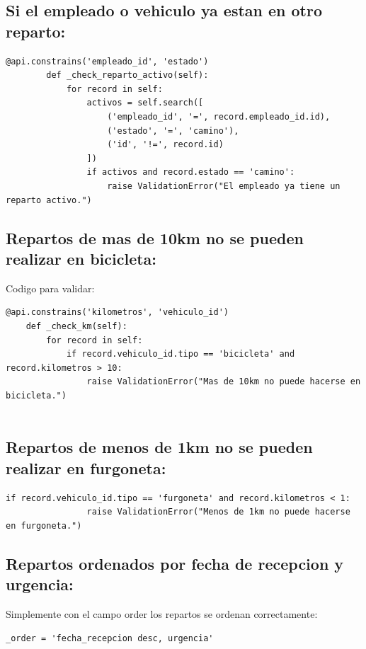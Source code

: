 \documentclass[a4paper, 11pt]{article}
\begin{document}
    \subsection{Si el empleado o vehiculo ya estan en otro reparto:}
    \begin{lstlisting}[frame=single,breaklines=true]
        @api.constrains('empleado_id', 'estado')
        def _check_reparto_activo(self):
            for record in self:
                activos = self.search([
                    ('empleado_id', '=', record.empleado_id.id),
                    ('estado', '=', 'camino'),
                    ('id', '!=', record.id)
                ])
                if activos and record.estado == 'camino':
                    raise ValidationError("El empleado ya tiene un reparto activo.")
               \end{lstlisting}

    \subsection{Repartos de mas de 10km no se pueden realizar en bicicleta:}
    Codigo para validar:
    \begin{lstlisting}[frame=single,breaklines=true]
    @api.constrains('kilometros', 'vehiculo_id')
    def _check_km(self):
        for record in self:
            if record.vehiculo_id.tipo == 'bicicleta' and record.kilometros > 10:
                raise ValidationError("Mas de 10km no puede hacerse en bicicleta.")
            
             \end{lstlisting}
    \subsection{Repartos de menos de 1km no se pueden realizar en furgoneta:}
    \begin{lstlisting}[frame=single,breaklines=true]
            if record.vehiculo_id.tipo == 'furgoneta' and record.kilometros < 1:
                raise ValidationError("Menos de 1km no puede hacerse en furgoneta.")
             \end{lstlisting}


    \subsection{Repartos ordenados por fecha de recepcion y urgencia:}
    Simplemente con el campo order los repartos se ordenan correctamente:
    \begin{lstlisting}[frame=single,breaklines=true]
        _order = 'fecha_recepcion desc, urgencia'
    \end{lstlisting}
\end{document}

